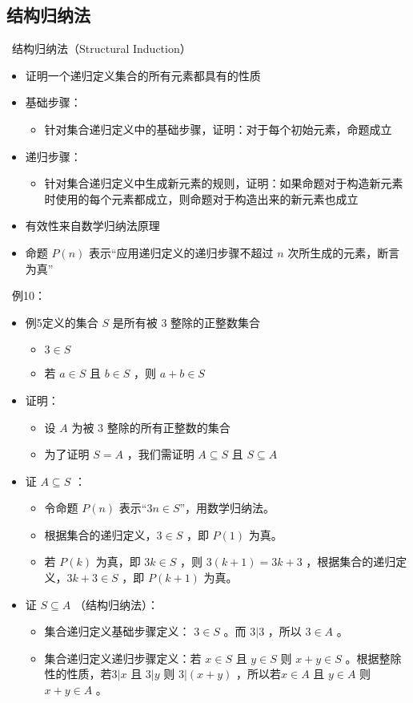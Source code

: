 \documentclass[UTF8]{report}
\theoremstyle{MyLineTheoremStyle} %
\theoremstyle{MyBlockTheoremStyle} %
\theoremstyle{MySubsubsectionStyle} %
\begin{document}
\subsection{结构归纳法}
\textbullet\ 结构归纳法（Structural Induction）
\begin{itemize}
    \item 证明一个递归定义集合的所有元素都具有的性质
    \item 基础步骤：
    \begin{itemize}
        \item 针对集合递归定义中的基础步骤，证明：对于每个初始元素，命题成立
    \end{itemize}
    \item 递归步骤：
    \begin{itemize}
        \item 针对集合递归定义中生成新元素的规则，证明：如果命题对于构造新元素时使用的每个元素都成立，则命题对于构造出来的新元素也成立
    \end{itemize}
    \item 有效性来自数学归纳法原理
    \item 命题 $P(n)$ 表示“应用递归定义的递归步骤不超过 $n$ 次所生成的元素，断言为真”
\end{itemize}

\textbullet\ 例10：
\begin{itemize}
    \item 例5定义的集合 $S$ 是所有被 3 整除的正整数集合
    \begin{itemize}
        \item $3 \in S$
        \item 若 $a \in S$ 且 $b \in S$ ，则 $a + b \in S$
    \end{itemize}
    \item 证明：
    \begin{itemize}
        \item 设 $A$ 为被 3 整除的所有正整数的集合
        \item 为了证明 $S = A$ ，我们需证明 $A \subseteq S$ 且 $S \subseteq A$
    \end{itemize}
    \item 证 $A \subseteq S$ ：
    \begin{itemize}
        \item 令命题 $P(n)$ 表示“$3n \in S$”，用数学归纳法。
        \item 根据集合的递归定义，$3 \in S$ ，即 $P(1)$ 为真。
        \item 若 $P(k)$ 为真，即 $3k \in S$ ，则 $3(k + 1) = 3k + 3$ ，根据集合的递归定义，$3k + 3 \in S$ ，即 $P(k + 1)$ 为真。
    \end{itemize}
    \item 证 $S \subseteq A$ （结构归纳法）：
    \begin{itemize}
        \item 集合递归定义基础步骤定义： $3 \in S$ 。而 $3|3$ ，所以 $3 \in A$ 。
        \item 集合递归定义递归步骤定义：若 $x \in S$ 且 $y \in S$ 则 $x+y \in S$ 。根据整除性的性质，若$3|x$ 且 $3|y$ 则 $3|(x+y)$ ，所以若$x \in A$ 且 $y \in A$ 则 $x+y \in A$ 。
    \end{itemize}
\end{itemize}
\end{document}
